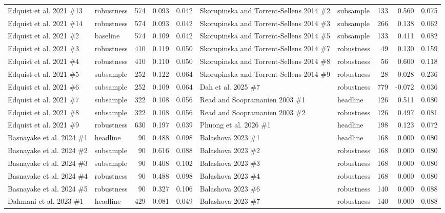 {\begin{longtable}{@{}p{3.0cm} l r r r@{\hspace{0.8em}}p{3.0cm} l r r r@{}}
Edquist et al. 2021 \#13 & robustness & 574 & 0.093 & 0.042 & Skorupinska and Torrent-Sellens 2014 \#2 & subsample & 133 & 0.560 & 0.075 \\
Edquist et al. 2021 \#14 & robustness & 574 & 0.093 & 0.042 & Skorupinska and Torrent-Sellens 2014 \#3 & subsample & 266 & 0.138 & 0.062 \\
Edquist et al. 2021 \#2 & baseline & 574 & 0.109 & 0.042 & Skorupinska and Torrent-Sellens 2014 \#5 & subsample & 133 & 0.411 & 0.082 \\
Edquist et al. 2021 \#3 & robustness & 410 & 0.119 & 0.050 & Skorupinska and Torrent-Sellens 2014 \#7 & robustness & 49 & 0.130 & 0.159 \\
Edquist et al. 2021 \#4 & robustness & 410 & 0.110 & 0.050 & Skorupinska and Torrent-Sellens 2014 \#8 & robustness & 56 & 0.600 & 0.118 \\
Edquist et al. 2021 \#5 & subsample & 252 & 0.122 & 0.064 & Skorupinska and Torrent-Sellens 2014 \#9 & robustness & 28 & 0.028 & 0.236 \\
Edquist et al. 2021 \#6 & subsample & 252 & 0.109 & 0.064 & Dah et al. 2025 \#7 & robustness & 779 & -0.072 & 0.036 \\
Edquist et al. 2021 \#7 & subsample & 322 & 0.108 & 0.056 & Read and Soopramanien 2003 \#1 & headline & 126 & 0.511 & 0.080 \\
Edquist et al. 2021 \#8 & subsample & 322 & 0.108 & 0.056 & Read and Soopramanien 2003 \#2 & robustness & 126 & 0.497 & 0.081 \\
Edquist et al. 2021 \#9 & robustness & 630 & 0.197 & 0.039 & Phuong et al. 2026 \#1 & headline & 198 & 0.123 & 0.072 \\
Basnayake et al. 2024 \#1 & headline & 90 & 0.488 & 0.098 & Balashova 2023 \#1 & headline & 168 & 0.000 & 0.080 \\
Basnayake et al. 2024 \#2 & subsample & 90 & 0.616 & 0.088 & Balashova 2023 \#2 & robustness & 168 & 0.000 & 0.080 \\
Basnayake et al. 2024 \#3 & subsample & 90 & 0.408 & 0.102 & Balashova 2023 \#3 & robustness & 168 & 0.000 & 0.080 \\
Basnayake et al. 2024 \#4 & robustness & 90 & 0.488 & 0.098 & Balashova 2023 \#4 & robustness & 168 & 0.000 & 0.080 \\
Basnayake et al. 2024 \#5 & robustness & 90 & 0.327 & 0.106 & Balashova 2023 \#6 & robustness & 140 & 0.000 & 0.088 \\
Dahmani et al. 2023 \#1 & headline & 429 & 0.081 & 0.049 & Balashova 2023 \#7 & robustness & 140 & 0.000 & 0.088 \\

\end{longtable}}
